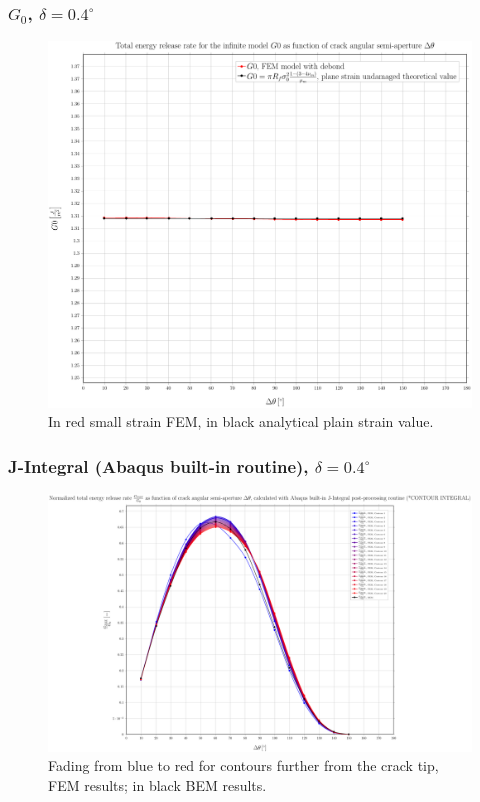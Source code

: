 \documentclass[first,firstsupp,lastsupp,handout,last,hyperref,table]{ETHclass}
\begin{document}
\begin{frame}
\frametitle{\small $G_{0}$, $\delta=0.4^{\circ}$}
\vspace{-0.5cm}
\centering
\captionsetup[figure]{font=scriptsize,labelfont=scriptsize}
\begin{figure}[!h]
\centering
\includegraphics[height=0.7\textheight]{2017-07-10_AbqRunSummary_SmallStrainD04_G0_Summary.pdf}
  \caption{\scriptsize In red small strain FEM, in black analytical plain strain value.}
  \label{fig:res1}
\end{figure}
\end{frame}

\begin{frame}
\frametitle{\small J-Integral (Abaqus built-in routine), $\delta=0.4^{\circ}$}
\vspace{-0.5cm}
\centering
\captionsetup[figure]{font=scriptsize,labelfont=scriptsize}
\begin{figure}[!h]
\centering
\includegraphics[height=0.7\textheight]{2017-07-10_AbqRunSummary_SmallStrainD04_J-INT_Summary.pdf}
  \caption{\scriptsize Fading from blue to red for contours further from the crack tip, FEM results; in black BEM results.}
  \label{fig:res1}
\end{figure}
\end{frame}
\end{document}
